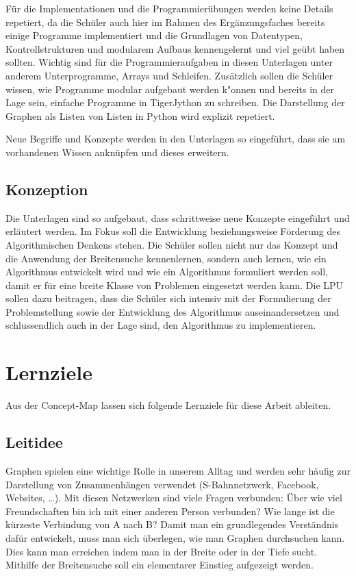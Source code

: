 F\"ur die Implementationen und die Programmier\"ubungen werden keine Details repetiert, da die Sch\"uler auch hier im Rahmen des Erg\"anzungsfaches bereits einige Programme implementiert und die Grundlagen von Datentypen, Kontrollstrukturen und modularem Aufbaus kennengelernt und viel ge\"ubt haben sollten. 
Wichtig sind f\"ur die Programmieraufgaben in diesen Unterlagen unter anderem Unterprogramme, Arrays und Schleifen.
Zus\"atzlich sollen die Sch\"uler  wissen, wie Programme modular aufgebaut werden k"onnen und bereits in der Lage sein, einfache Programme in TigerJython zu schreiben. 
Die Darstellung der Graphen als Listen von Listen in Python wird explizit repetiert.


Neue Begriffe und Konzepte werden in den Unterlagen so eingef\"uhrt, dass sie am vorhandenen Wissen ankn\"upfen und dieses erweitern.

\subsection{Konzeption}
Die Unterlagen sind so aufgebaut, dass schrittweise neue Konzepte eingef\"uhrt und erl\"autert werden. Im Fokus soll die Entwicklung beziehungsweise F\"orderung des Algorithmischen Denkens stehen. Die Sch\"uler sollen nicht nur das Konzept und die Anwendung der Breitensuche kennenlernen, sondern auch lernen, wie ein Algorithmus entwickelt wird und wie ein Algorithmus formuliert werden soll, damit er f\"ur eine breite Klasse von Problemen eingesetzt werden kann. Die LPU sollen dazu beitragen, dass die Sch\"uler sich intensiv mit der Formulierung der Problemstellung sowie der Entwicklung des Algorithmus auseinandersetzen und schlussendlich auch in der Lage sind, den Algorithmus zu implementieren.


\section{Lernziele}

Aus der Concept-Map lassen sich folgende Lernziele für diese Arbeit ableiten. 

\subsection{Leitidee}

Graphen spielen eine wichtige Rolle in unserem Alltag und werden sehr häufig zur Darstellung von Zusammenhängen verwendet (S-Bahnnetzwerk, Facebook, Websites, \dots). 
Mit diesen Netzwerken sind viele Fragen verbunden: Über wie viel Freundschaften bin ich mit einer anderen Person verbunden? Wie lange ist die kürzeste Verbindung von A nach B?
Damit man ein grundlegendes Verständnis dafür entwickelt, muss man sich überlegen, wie man Graphen durchsuchen kann. 
Dies kann man erreichen indem man in der Breite oder in der Tiefe sucht. 
Mithilfe der Breitensuche soll ein elementarer Einstieg aufgezeigt werden. 


